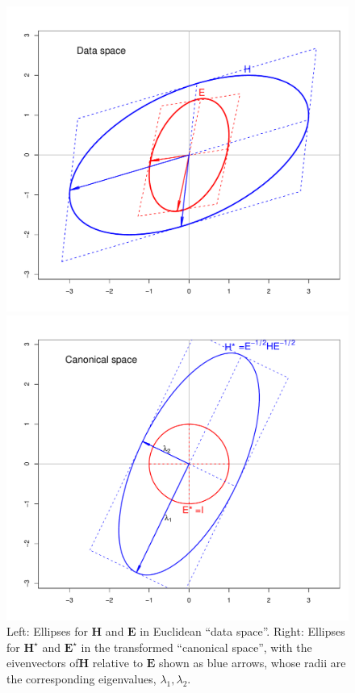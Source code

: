\documentclass[11pt]{article}%
\newcommand{\TODO}[1]{\begin{quotation}\color{blue}\textbf{ToDo}: #1\end{quotation}}
\newcommand*{\mat}[1]{\ensuremath{\bm{#1}}}
\begin{document}
\begin{figure}[htb]
  \begin{minipage}[c]{.495\textwidth}
   \includegraphics[width=1\linewidth,clip]{fig/ellipse-geneig1}
   \end{minipage}%
  \hfill
  \begin{minipage}[c]{.495\textwidth}
   \includegraphics[width=1\linewidth,clip]{fig/ellipse-geneig2}
  \end{minipage}
  \caption{Left: Ellipses for \mat{H} and \mat{E} in Euclidean ``data space''. 
   Right: Ellipses for $\mat{H}^\star$ and $\mat{E}^\star$ in the transformed ``canonical space'',
   with the eivenvectors of\mat{H} relative to \mat{E} shown as blue arrows, whose radii
   are the corresponding eigenvalues, $\lambda_1, \lambda_2$. }%
  \label{fig:ellipse-geneig}
\end{figure}
\end{document}

